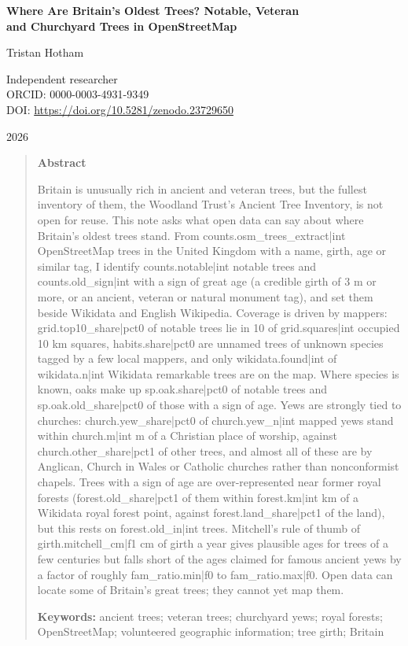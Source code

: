 \documentclass[11pt,a4paper]{article}
\begin{document}
\begin{center}
{\Large\bfseries Where Are Britain's Oldest Trees? Notable, Veteran\\[2pt] and Churchyard Trees in OpenStreetMap\par}
\vspace{1.2em}
{\large Tristan Hotham\par}
\vspace{0.3em}
{\small Independent researcher\\
ORCID: 0000-0003-4931-9349\\
DOI: \href{https://doi.org/10.5281/zenodo.23729650}{https://doi.org/10.5281/zenodo.23729650}\par}
\vspace{0.8em}
2026
\end{center}

\begin{quote}
\small
\begin{center}\textbf{Abstract}\end{center}
Britain is unusually rich in ancient and veteran trees, but the fullest inventory of them, the Woodland Trust's Ancient Tree Inventory, is not open for reuse. This note asks what open data can say about where Britain's oldest trees stand. From {{counts.osm_trees_extract|int}} OpenStreetMap trees in the United Kingdom with a name, girth, age or similar tag, I identify {{counts.notable|int}} notable trees and {{counts.old_sign|int}} with a sign of great age (a credible girth of 3 m or more, or an ancient, veteran or natural monument tag), and set them beside Wikidata and English Wikipedia. Coverage is driven by mappers: {{grid.top10_share|pct0}} of notable trees lie in 10 of {{grid.squares|int}} occupied 10 km squares, {{habits.share|pct0}} are unnamed trees of unknown species tagged by a few local mappers, and only {{wikidata.found|int}} of {{wikidata.n|int}} Wikidata remarkable trees are on the map. Where species is known, oaks make up {{sp.oak.share|pct0}} of notable trees and {{sp.oak.old_share|pct0}} of those with a sign of age. Yews are strongly tied to churches: {{church.yew_share|pct0}} of {{church.yew_n|int}} mapped yews stand within {{church.m|int}} m of a Christian place of worship, against {{church.other_share|pct1}} of other trees, and almost all of these are by Anglican, Church in Wales or Catholic churches rather than nonconformist chapels. Trees with a sign of age are over-represented near former royal forests ({{forest.old_share|pct1}} of them within {{forest.km|int}} km of a Wikidata royal forest point, against {{forest.land_share|pct1}} of the land), but this rests on {{forest.old_in|int}} trees. Mitchell's rule of thumb of {{girth.mitchell_cm|f1}} cm of girth a year gives plausible ages for trees of a few centuries but falls short of the ages claimed for famous ancient yews by a factor of roughly {{fam_ratio.min|f0}} to {{fam_ratio.max|f0}}. Open data can locate some of Britain's great trees; they cannot yet map them.

\textbf{Keywords:} ancient trees; veteran trees; churchyard yews; royal forests; OpenStreetMap; volunteered geographic information; tree girth; Britain
\end{quote}
\end{document}
